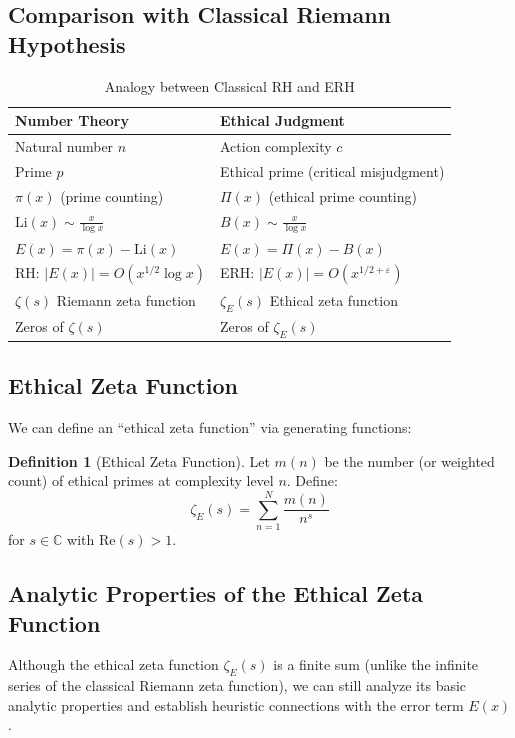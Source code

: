 \documentclass[12pt,a4paper]{article}
\theoremstyle{definition}
\newtheorem{definition}[theorem]{Definition}
\theoremstyle{remark}
\begin{document}
\subsection{Comparison with Classical Riemann Hypothesis}

\begin{table}[htbp]
\centering
\caption{Analogy between Classical RH and ERH}
\label{tab:analogy}
\begin{tabular}{ll}
\toprule
\textbf{Number Theory} & \textbf{Ethical Judgment} \\
\midrule
Natural number $n$ & Action complexity $c$ \\
Prime $p$ & Ethical prime (critical misjudgment) \\
$\pi(x)$ (prime counting) & $\Pi(x)$ (ethical prime counting) \\
$\text{Li}(x) \sim \frac{x}{\log x}$ & $B(x) \sim \frac{x}{\log x}$ \\
$E(x) = \pi(x) - \text{Li}(x)$ & $E(x) = \Pi(x) - B(x)$ \\
RH: $|E(x)| = O(x^{1/2} \log x)$ & ERH: $|E(x)| = O(x^{1/2 + \varepsilon})$ \\
$\zeta(s)$ Riemann zeta function & $\zeta_E(s)$ Ethical zeta function \\
Zeros of $\zeta(s)$ & Zeros of $\zeta_E(s)$ \\
\bottomrule
\end{tabular}
\end{table}

\subsection{Ethical Zeta Function}

We can define an ``ethical zeta function'' via generating functions:

\begin{definition}[Ethical Zeta Function]
Let $m(n)$ be the number (or weighted count) of ethical primes at complexity level $n$. Define:
\[
\zeta_E(s) = \sum_{n=1}^{N} \frac{m(n)}{n^s}
\]
for $s \in \mathbb{C}$ with $\text{Re}(s) > 1$.
\end{definition}

\subsection{Analytic Properties of the Ethical Zeta Function}

Although the ethical zeta function $\zeta_E(s)$ is a finite sum (unlike the infinite series of the classical Riemann zeta function), we can still analyze its basic analytic properties and establish heuristic connections with the error term $E(x)$.
\end{document}
